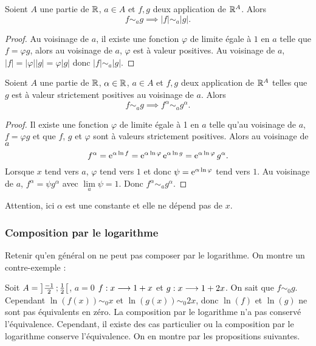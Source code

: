 \begin{prop}
  Soient \(A\) une partie de \(\mathbb{R}\), \(a \in A\) et \(f, g\) deux application de \(\mathbb{R}^A\). Alors
  \begin{equation}
    f \sim_a g \implies |f| \sim_a |g|.
  \end{equation}
\end{prop}
\begin{proof}
  Au voisinage de \(a\), il existe une fonction \(\varphi\) de limite égale à \(1\) en \(a\) telle que \(f=\varphi g\), alors au voisinage de \(a\), \(\varphi\) est à valeur positives. Au voisinage de \(a\), \(|f|=|\varphi| |g|=\varphi |g|\) donc \(|f| \sim_a |g|\).
\end{proof}
%
\begin{prop}
  Soient \(A\) une partie de \(\mathbb{R}\), \(\alpha \in \mathbb{R}\),  \(a \in A\) et \(f, g\) deux application de \(\mathbb{R}^A\) telles que \(g\) est à valeur strictement positives au voisinage de \(a\). Alors
  \begin{equation}
    f \sim_a g \implies f^\alpha \sim_a g^\alpha.
  \end{equation}
\end{prop}
\begin{proof}
  Il existe une fonction \(\varphi\) de limite égale à 1 en \(a\) telle qu'au voisinage de \(a\), \(f=\varphi g\) et que \(f\), \(g\) et \(\varphi\) sont à valeurs strictement positives. Alors au voisinage de \(a\)
  \begin{equation}
    f^\alpha=\operatorname{e}^{\alpha \ln f}=\operatorname{e}^{\alpha \ln \varphi} \operatorname{e}^{\alpha \ln g}=\operatorname{e}^{\alpha \ln \varphi} g^\alpha.
  \end{equation}
  Lorsque \(x\) tend vers \(a\), \(\varphi\) tend vers \(1\) et donc \(\psi=\operatorname{e}^{\alpha \ln \varphi}\) tend vers \(1\). Au voisinage de \(a\), \(f^\alpha = \psi g^\alpha\) avec \(\lim\limits_{a} \psi =1\). Donc \(f^\alpha \sim_a g^\alpha\).
\end{proof}

Attention, ici \(\alpha\) est une constante et elle ne dépend pas de \(x\).

\subsubsection{Composition par le logarithme}

Retenir qu'en général on ne peut pas composer par le logarithme. On montre un contre-exemple :

Soit \(A=\left] \frac{-1}{2} \, ;  \frac{1}{2} \right[\), \(a=0\) \(f:x \longrightarrow 1+x\) et \(g:x \longrightarrow 1+2x\). On sait que \(f \sim_0 g\). Cependant \(\ln(f(x)) \sim_0 x\) et \(\ln(g(x)) \sim_0 2x\), donc \(\ln(f)\) et \(\ln(g)\) ne sont pas équivalents en zéro. La composition par le logarithme n'a pas conservé l'équivalence. Cependant, il existe des cas particulier ou la composition par le logarithme conserve l'équivalence. On en montre par les propositions suivantes.


